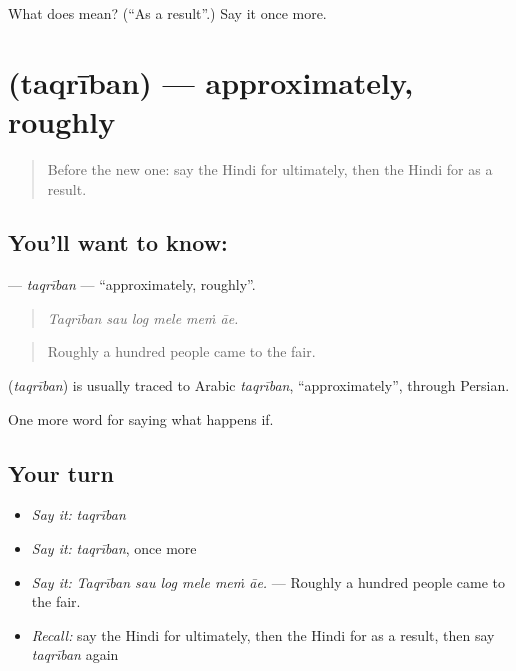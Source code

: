 \begin{tcolorbox}[breakable,colback=teal!4,colframe=teal!35!black,title={Before you move on}]
What does  mean? (\textquotedblleft{}As a result\textquotedblright{}.) Say it once more.
\end{tcolorbox}
\section[\texorpdfstring{\hi{तक़रीबन} (taqrīban)}{तक़रीबन (taqrīban)}]{ (taqrīban) — approximately, roughly}

\label{lesson:HI-C554-taqriban}



\begin{quote}
Before the new one: say the Hindi for ultimately, then the Hindi for as a result.
\end{quote}

\subsection*{You'll want to know: }
\textbf{} — \emph{taqrīban} — \textquotedblleft{}approximately, roughly\textquotedblright{}.

\begin{quote}
     
\end{quote}

\begin{quote}
\emph{Taqrīban sau log mele meṁ āe.}
\end{quote}

\begin{quote}
Roughly a hundred people came to the fair.
\end{quote}

\begin{cousinweb}
\textbf{} (\emph{taqrīban}) is usually traced to Arabic \emph{taqrīban}, \textquotedblleft{}approximately\textquotedblright{}, through Persian.
\end{cousinweb}

\begin{grammarlens}[title={What you've built}]
One more word for saying what happens if.
\end{grammarlens}

\subsection*{Your turn}
\begin{itemize}
\raggedright
  \item \emph{Say it:} \emph{taqrīban}
  \item \emph{Say it:} \emph{taqrīban}, once more
  \item \emph{Say it:} \emph{Taqrīban sau log mele meṁ āe.} — Roughly a hundred people came to the fair.
  \item \emph{Recall:} say the Hindi for ultimately, then the Hindi for as a result, then say \emph{taqrīban} again
\end{itemize}

